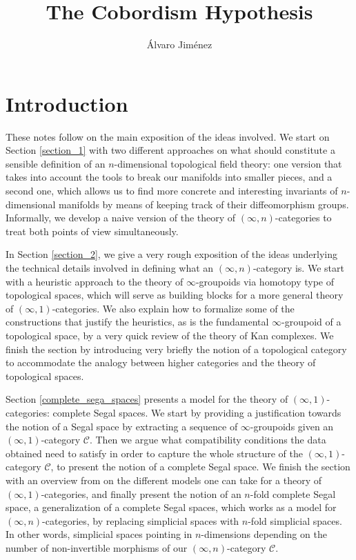 \documentclass[a4paper,11pt]{article}
\date{}
\newcommand{\ccal}{\mathcal{C}}
\theoremstyle{plain}
\theoremstyle{definition}
\theoremstyle{remark}
\begin{document}
\title{The Cobordism Hypothesis}
\author{Álvaro Jiménez}
\maketitle


\tableofcontents


\section{Introduction}


These notes follow \cite{lurie} on the main exposition of the ideas involved. We start on Section \ref{section_1} with two different approaches on what should constitute a sensible definition of an $n$-dimensional topological field theory: one version that takes into account the tools to break our manifolds into smaller pieces, and a second one, which allows us to find more concrete and interesting invariants of $n$-dimensional manifolds by means of keeping track of their diffeomorphism groups. Informally, we develop a naive version of the theory of $(\infty, n)$-categories to treat both points of view simultaneously. 


In Section \ref{section_2}, we give a very rough exposition of the ideas underlying the technical details involved in defining what an $(\infty, n)$-category is. We start with a heuristic approach to the theory of $\infty$-groupoids via homotopy type of topological spaces, which will serve as building blocks for a more general theory of $(\infty, 1)$-categories. We also explain how to formalize some of the constructions that justify the heuristics, as is the fundamental $\infty$-groupoid of a topological space, by a very quick review of the theory of Kan complexes. We finish the section by introducing very briefly the notion of a topological category to accommodate the analogy between higher categories and the theory of topological spaces. 


Section \ref{complete_sega_spaces} presents a model for the theory of $(\infty, 1)$-categories: complete Segal spaces. We start by providing a justification towards the notion of a Segal space by extracting a sequence of $\infty$-groupoids given an $(\infty, 1)$-category $\ccal$. Then we argue what compatibility conditions the data obtained need to satisfy in order to capture the whole structure of the $(\infty, 1)$-category $\ccal$, to present the notion of a complete Segal space. We finish the section with an overview from \cite{bergner} on the different models one can take for a theory of $(\infty, 1)$-categories, and finally present the notion of an $n$-fold complete Segal space, a generalization of a complete Segal spaces, which works as a model for $(\infty, n)$-categories, by replacing simplicial spaces with $n$-fold simplicial spaces. In other words, simplicial spaces pointing in $n$-dimensions depending on the number of non-invertible morphisms of our $(\infty, n)$-category $\ccal$. 
\end{document}
